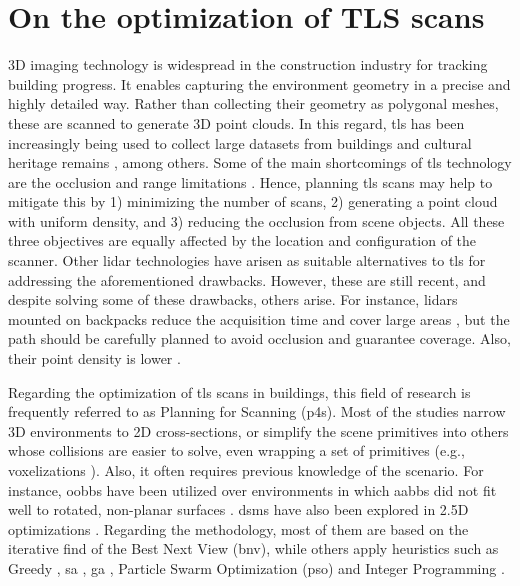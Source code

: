 \section{On the optimization of TLS scans}

3D imaging technology is widespread in the construction industry for tracking building progress. It enables capturing the environment geometry in a precise and highly detailed way. Rather than collecting their geometry as polygonal meshes, these are scanned to generate 3D point clouds. In this regard, \acrshort{tls} has been increasingly being used to collect large datasets from buildings \cite{shariq_revolutionising_2020} and cultural heritage remains \cite{banfi_integration_2019, ham_phased_2020, andriasyan_point_2020}, among others. Some of the main shortcomings of \acrshort{tls} technology are the occlusion and range limitations \cite{soudarissanane_optimizing_2012}. Hence, planning \acrshort{tls} scans may help to mitigate this by 1) minimizing the number of scans, 2) generating a point cloud with uniform density, and 3) reducing the occlusion from scene objects. All these three objectives are equally affected by the location and configuration of the scanner. Other \acrshort{lidar} technologies have arisen as suitable alternatives to \acrshort{tls} for addressing the aforementioned drawbacks. However, these are still recent, and despite solving some of these drawbacks, others arise. For instance, \acrshort{lidar}s mounted on backpacks reduce the acquisition time and cover large areas \cite{rodriguez-gonzalvez_mobile_2017}, but the path should be carefully planned to avoid occlusion and guarantee coverage. Also, their point density is lower \cite{bienert_comparison_2018}.

Regarding the optimization of \acrshort{tls} scans in buildings, this field of research is frequently referred to as Planning for Scanning (\acrshort{p4s}). Most of the studies narrow 3D environments to 2D cross-sections, or simplify the scene primitives into others whose collisions are easier to solve, even wrapping a set of primitives (e.g., voxelizations \cite{wakisaka_optimal_2019}). Also, it often requires previous knowledge of the scenario. For instance, \acrshort{oobb}s have been utilized over environments in which \acrshort{aabb}s did not fit well to rotated, non-planar surfaces \cite{li_3d_2022}. \acrshort{dsm}s have also been explored in 2.5D optimizations \cite{starek_viewshed_2020}. Regarding the methodology, most of them are based on the iterative find of the Best Next View (\acrshort{bnv}), while others apply heuristics such as Greedy \cite{ giorgini_sensor-based_2019}, \acrshort{sa} \cite{chen_indoor_2018}, \acrshort{ga} \cite{jia_comparison_2017}, Particle Swarm Optimization (\acrshort{pso}) \cite{jia_comparison_2017} and Integer Programming \cite{wakisaka_optimal_2019}.

